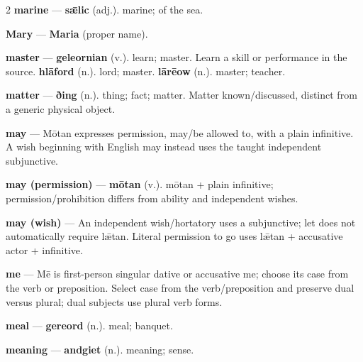 \begin{multicols}{2}
\textbf{marine} — \textbf{sǣlic} (adj.). marine; of the sea.\par
\textbf{Mary} — \textbf{Maria} (proper name).\par
\textbf{master} — \textbf{geleornian} (v.). learn; master. Learn a skill or performance in the source. \textbf{hlāford} (n.). lord; master. \textbf{lārēow} (n.). master; teacher.\par
\textbf{matter} — \textbf{ðing} (n.). thing; fact; matter. Matter known/discussed, distinct from a generic physical object.\par
\textbf{may} — Mōtan expresses permission, may/be allowed to, with a plain infinitive. A wish beginning with English may instead uses the taught independent subjunctive.\par
\textbf{may (permission)} — \textbf{mōtan} (v.). mōtan + plain infinitive; permission/prohibition differs from ability and independent wishes.\par
\textbf{may (wish)} — An independent wish/hortatory uses a subjunctive; let does not automatically require lǣtan. Literal permission to go uses lǣtan + accusative actor + infinitive.\par
\textbf{me} — Mē is first-person singular dative or accusative me; choose its case from the verb or preposition. Select case from the verb/preposition and preserve dual versus plural; dual subjects use plural verb forms.\par
\textbf{meal} — \textbf{gereord} (n.). meal; banquet.\par
\textbf{meaning} — \textbf{andgiet} (n.). meaning; sense.\par

\end{multicols}
